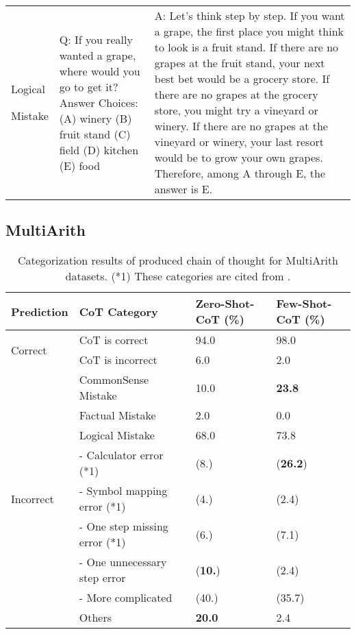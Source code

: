 \documentclass{article}
\newcommand{\CoT}{chain of thought\xspace}
\newcommand{\theirsz}{Zero-shot\xspace}
\newcommand{\ngmark}{{\textbf{\color{red}{\ding{55}}}}}
\newcommand{\bblue}[1]{{\textbf{\color{blue}{#1}}}}
\newcommand{\myspace}{}
\begin{document}
\begin{center}
\begin{longtable}{|p{}|p{}|p{}|}
Logical \par Mistake &Q: If you really wanted a grape, where would you go to get it? Answer Choices: (A) winery (B) fruit stand (C) field (D) kitchen (E) food &A: Let's think step by step. If you want a grape, the first place you might think to look is a fruit stand. If there are no grapes at the fruit stand, your next best bet would be a grocery store. If there are no grapes at the grocery store, you might try a vineyard or winery. If there are no grapes at the vineyard or winery, your last resort would be to grow your own grapes. Therefore, among A through E, the answer is E. \ngmark \myspace \bblue{(GT : (B), \theirsz : (B))}\\



\end{longtable}
\end{center} 
\subsection{MultiArith}

\begin{table}[h]
\centering
\captionsetup{width=.94\textwidth}
\caption{Categorization results of produced \CoT for MultiArith datasets. 
(*1) These categories are cited from \cite{cot_wei}.
}
\label{tab:analysis_multiarith}
\begin{tabular}{p{}p{}p{}p{}}
\toprule
Prediction &CoT Category &Zero-Shot-CoT (\%) &Few-Shot-CoT (\%) \\\midrule \midrule
\multirow{2}{*}{Correct} &CoT is correct &94.0 &98.0 \\
&CoT is incorrect &6.0 &2.0 \\

\midrule

\multirow{9}{*}{Incorrect} &CommonSense Mistake &10.0 &\textbf{23.8} \\
&Factual Mistake &2.0 &0.0 \\
&Logical Mistake &68.0 &73.8 \\
& - Calculator error (*1) & (8.) &(\textbf{26.2}) \\
& - Symbol mapping error (*1) & (4.) & (2.4) \\
& - One step missing error (*1) & (6.) & (7.1) \\
& - One unnecessary step error &(\textbf{10.}) & (2.4) \\
& - More complicated & (40.) & (35.7) \\
&Others &\textbf{20.0} &2.4 \\
\bottomrule
\end{tabular}
\end{table}
\end{document}
